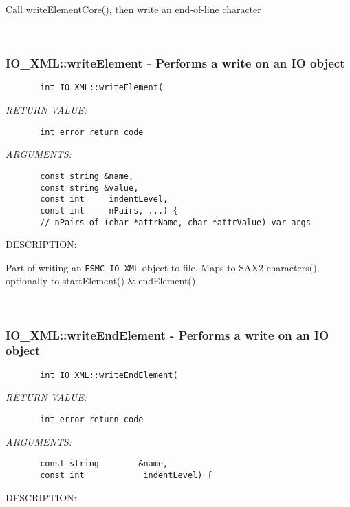      Call writeElementCore(), then write an end-of-line character
   
 
\mbox{}\hrulefill\ 
 
\subsubsection [IO\_XML::writeElement] {IO\_XML::writeElement - Performs a write on an IO object}


  
\begin{verbatim}       int IO_XML::writeElement(\end{verbatim}{\em RETURN VALUE:}
\begin{verbatim}       int error return code\end{verbatim}{\em ARGUMENTS:}
\begin{verbatim}       const string &name,
       const string &value,
       const int     indentLevel,
       const int     nPairs, ...) {
       // nPairs of (char *attrName, char *attrValue) var args
 \end{verbatim}
{\sf DESCRIPTION:\\ }


        Part of writing an {\tt ESMC\_IO\_XML} object to file.
        Maps to SAX2 characters(), optionally to startElement() & endElement().
   
 
\mbox{}\hrulefill\ 
 
\subsubsection [IO\_XML::writeEndElement] {IO\_XML::writeEndElement - Performs a write on an IO object}


  
\begin{verbatim}       int IO_XML::writeEndElement(\end{verbatim}{\em RETURN VALUE:}
\begin{verbatim}       int error return code\end{verbatim}{\em ARGUMENTS:}
\begin{verbatim}       const string        &name,
       const int            indentLevel) {
 \end{verbatim}
{\sf DESCRIPTION:\\ }


